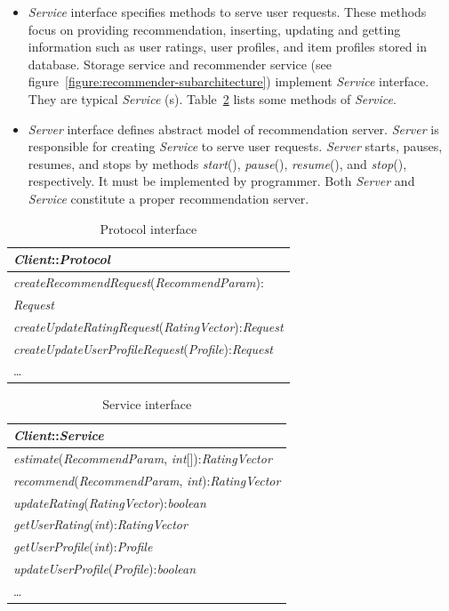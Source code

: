 \documentclass[a4paper,twoside]{article}
\begin{document}
\begin{itemize}
\item \textit{Service} interface specifies methods to serve user requests. These methods focus on providing recommendation, inserting, updating and getting information such as user ratings, user profiles, and item profiles stored in database. Storage service and recommender service (see figure~\ref{figure:recommender-subarchitecture}) implement \textit{Service} interface. They are typical \textit{Service} (s). Table~\ref{table:service} lists some methods of \textit{Service}.
\item \textit{Server} interface defines abstract model of recommendation server. \textit{Server} is responsible for creating \textit{Service} to serve user requests. \textit{Server} starts, pauses, resumes, and stops by methods \textit{start}(), \textit{pause}(), \textit{resume}(), and \textit{stop}(), respectively. It must be implemented by programmer. Both \textit{Server} and \textit{Service} constitute a proper recommendation server.
\end{itemize}
\begin{table}
\centering
\caption{Protocol interface}
\label{table:protocol}
\small
\begin{tabular}{|l|} \hline
\textit{Client}::\textit{Protocol} \\ \hline
\textit{createRecommendRequest}(\textit{RecommendParam}):\\ \textit{Request} \\
\textit{createUpdateRatingRequest}(\textit{RatingVector}):\textit{Request} \\
\textit{createUpdateUserProfileRequest}(\textit{Profile}):\textit{Request} \\
\ldots \\ \hline
\end{tabular}
\end{table}
\begin{table}
\centering
\caption{Service interface}
\label{table:service}
\small
\begin{tabular}{|l|} \hline
\textit{Client}::\textit{Service} \\ \hline
\textit{estimate}(\textit{RecommendParam}, \textit{int}[]):\textit{RatingVector} \\
\textit{recommend}(\textit{RecommendParam}, \textit{int}):\textit{RatingVector} \\
\textit{updateRating}(\textit{RatingVector}):\textit{boolean} \\
\textit{getUserRating}(\textit{int}):\textit{RatingVector} \\
\textit{getUserProfile}(\textit{int}):\textit{Profile} \\
\textit{updateUserProfile}(\textit{Profile}):\textit{boolean} \\
\ldots \\ \hline
\end{tabular}
\end{table}
\end{document}
